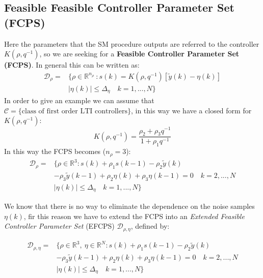 \subsection{Feasible Feasible Controller Parameter Set (FCPS)}
Here the parameters that the SM procedure outputs are referred to the controller $K(\rho,q^{-1})$, so we are seeking for a \textbf{Feasible Controller Parameter Set (FCPS)}. In general this can be written as: 
\begin{equation*}
    \begin{aligned}
        \mathcal{D}_\rho=&\{
        \rho\in\mathbb{R}^{n_\rho} \ : s(k)=K(\rho,q^{-1})[\tilde{y}(k)-\eta(k)]\\
        &\vert \eta(k) \vert \le \Delta_\eta \quad k=1,...,N 
    \}
    \end{aligned}
\end{equation*}
In order to give an example we can assume that $\mathcal{C}=\{\text{class of first order LTI controllers}\}$, in this way we have a closed form for $K(\rho,q^{-1})$:
\begin{equation}
    K(\rho,q^{-1})=\frac{\rho_2+\rho_3q^{-1}}{1+\rho_1 q^{-1}}
\end{equation}
In this way the FCPS becomes ($n_\rho=3$): 
\begin{equation}
    \begin{aligned}
        \mathcal{D}_\rho=&\{
        \rho\in\mathbb{R}^3: s(k) + \rho_1 s(k-1) -\rho_2 \tilde{y}(k)\\
        &-\rho_3 \tilde{y}(k-1) + \rho_2 \eta(k) + \rho_3 \eta(k-1)=0 \quad k=2,...,N\\
        &\vert \eta(k) \vert \le \Delta_\eta \quad k=1,...,N
    \}
    \end{aligned}
\end{equation}

We know that there is no way to eliminate the dependence on the noise samples $\eta(k)$, fir this reason we have to extend the FCPS into an \textit{Extended Feasible Controller Parameter Set} (EFCPS) $\mathcal{D}_{\rho,\eta}$, defined by: 

\begin{equation}
    \begin{aligned}
        \mathcal{D}_{\rho,\eta}=&\{
        \rho\in\mathbb{R}^3, \ \eta \in \mathbb{R}^N: s(k) + \rho_1 s(k-1) -\rho_2 \tilde{y}(k)\\
        &-\rho_3 \tilde{y}(k-1) + \rho_2 \eta(k) + \rho_3 \eta(k-1)=0 \quad k=2,...,N\\
        &\vert \eta(k) \vert \le \Delta_\eta \quad k=1,...,N
    \}
    \end{aligned}
\end{equation}

